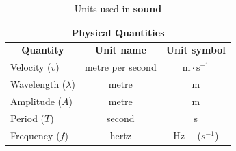 
\begin{table}[H]
\begin{center}
\begin{tabular}{|l|c|c|}\hline \hline 
\multicolumn{3}{|c|}{\textbf{Physical Quantities}}\\ \hline \hline
\multicolumn{1}{|c|}{\textbf{Quantity}} & \textbf{Unit name} & \textbf{Unit symbol}\\ \hline
Velocity ($v$) & metre per second & $\text{m} \cdot \text{s}^{-1}$ \\ \hline
Wavelength ($\lambda$) & metre & m \\ \hline
Amplitude ($A$) & metre & m \\ \hline
Period ($T$) & second & s \\ \hline
Frequency ($f$) & hertz & Hz \ \ ($s^{-1}$) \\ \hline
\end{tabular}
\end{center}
\caption{Units used in \textbf{sound} }
\label{table:sound::units}
\end{table}













